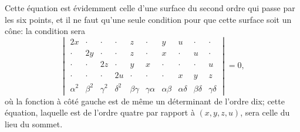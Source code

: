\documentclass[11pt,a4paper]{article}
\begin{document}
\clearpage

Cette \'{e}quation est \'{e}videmment celle d'une surface du second ordre qui passe par les six points, et il ne faut qu'une seule condition pour que cette surface soit un c\^{o}ne: la condition sera
\[
\begin{vmatrix}
2x & \cdot & \cdot & \cdot & z & \cdot & y & u & \cdot & \cdot \\
\cdot & 2y & \cdot & \cdot & z & \cdot & x & \cdot & u & \cdot \\
\cdot & \cdot & 2z & \cdot & y & x & \cdot & \cdot & \cdot & u \\
\cdot & \cdot & \cdot & 2u & \cdot & \cdot & \cdot & x & y & z \\
\alpha^2 & \beta^2 & \gamma^2 & \delta^2 & \beta\gamma & \gamma\alpha & \alpha\beta & \alpha\delta & \beta\delta & \gamma\delta
\end{vmatrix}
= 0,
\]
o\`{u} la fonction \`{a} c\^{o}t\'{e} gauche est de m\^{e}me un d\'{e}terminant de l'ordre dix; cette \'{e}quation, laquelle est de l'ordre quatre par rapport \`{a} $(x, y, z, u)$, sera celle du lieu du sommet.
\end{document}
